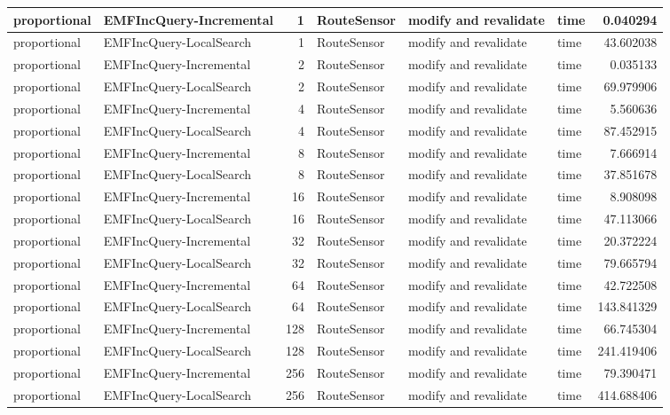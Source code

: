 \begin{table}
\begin{tabular}{| l | l | r | l | l | l | r |}
proportional & EMFIncQuery-Incremental & 1 & RouteSensor & modify and revalidate & time & 0.040294\\\hline
proportional & EMFIncQuery-LocalSearch & 1 & RouteSensor & modify and revalidate & time & 43.602038\\\hline
proportional & EMFIncQuery-Incremental & 2 & RouteSensor & modify and revalidate & time & 0.035133\\\hline
proportional & EMFIncQuery-LocalSearch & 2 & RouteSensor & modify and revalidate & time & 69.979906\\\hline
proportional & EMFIncQuery-Incremental & 4 & RouteSensor & modify and revalidate & time & 5.560636\\\hline
proportional & EMFIncQuery-LocalSearch & 4 & RouteSensor & modify and revalidate & time & 87.452915\\\hline
proportional & EMFIncQuery-Incremental & 8 & RouteSensor & modify and revalidate & time & 7.666914\\\hline
proportional & EMFIncQuery-LocalSearch & 8 & RouteSensor & modify and revalidate & time & 37.851678\\\hline
proportional & EMFIncQuery-Incremental & 16 & RouteSensor & modify and revalidate & time & 8.908098\\\hline
proportional & EMFIncQuery-LocalSearch & 16 & RouteSensor & modify and revalidate & time & 47.113066\\\hline
proportional & EMFIncQuery-Incremental & 32 & RouteSensor & modify and revalidate & time & 20.372224\\\hline
proportional & EMFIncQuery-LocalSearch & 32 & RouteSensor & modify and revalidate & time & 79.665794\\\hline
proportional & EMFIncQuery-Incremental & 64 & RouteSensor & modify and revalidate & time & 42.722508\\\hline
proportional & EMFIncQuery-LocalSearch & 64 & RouteSensor & modify and revalidate & time & 143.841329\\\hline
proportional & EMFIncQuery-Incremental & 128 & RouteSensor & modify and revalidate & time & 66.745304\\\hline
proportional & EMFIncQuery-LocalSearch & 128 & RouteSensor & modify and revalidate & time & 241.419406\\\hline
proportional & EMFIncQuery-Incremental & 256 & RouteSensor & modify and revalidate & time & 79.390471\\\hline
proportional & EMFIncQuery-LocalSearch & 256 & RouteSensor & modify and revalidate & time & 414.688406\\\hline

\end{tabular}
\end{table}
